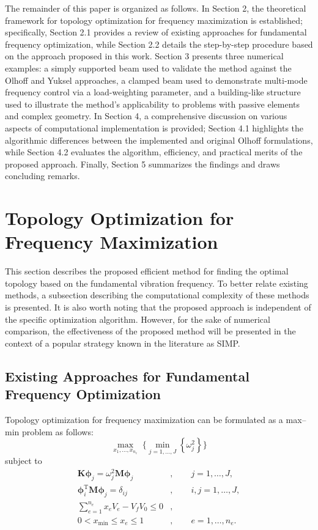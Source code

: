 \documentclass[applsci,article,submit,pdftex,moreauthors]{Definitions/mdpi}
\begin{document}
The remainder of this paper is organized as follows. In Section 2, the theoretical framework for topology optimization for frequency maximization is established; specifically, Section 2.1 provides a review of existing approaches for fundamental frequency optimization, while Section 2.2 details the step-by-step procedure based on the approach proposed in this work. Section 3 presents three numerical examples: a simply supported beam used to validate the method against the Olhoff and Yuksel approaches, a clamped beam used to demonstrate multi-mode frequency control via a load-weighting parameter, and a building-like structure used to illustrate the method's applicability to problems with passive elements and complex geometry. In Section 4, a comprehensive discussion on various aspects of computational implementation is provided; Section 4.1 highlights the algorithmic differences between the implemented and original Olhoff formulations, while Section 4.2 evaluates the algorithm, efficiency, and practical merits of the proposed approach. Finally, Section 5 summarizes the findings and draws concluding remarks.


\section{Topology Optimization for Frequency Maximization}

This section describes the proposed efficient method for finding the optimal topology based on the fundamental vibration frequency. To better relate existing methods, a subsection describing the computational complexity of these methods is presented. It is also worth noting that the proposed approach is independent of the specific optimization algorithm. However, for the sake of numerical comparison, the effectiveness of the proposed method will be presented in the context of a popular strategy known in the literature as SIMP.

\subsection{Existing Approaches for Fundamental Frequency Optimization}
Topology optimization for frequency maximization can be formulated as a max--min problem as follows:
\begin{equation}\label{eqn:minmax}
\max_{x_1,\ldots,x_{n_e}} \; \Bigg\{ \min_{j=1,\ldots,J} \left\{ \omega_j^2 \right\} \Bigg\}
\end{equation}
subject to
\begin{align*}
\mathbf{K}\boldsymbol{\phi}_j = \omega_j^2 \mathbf{M}\boldsymbol{\phi}_j &, \qquad j = 1,\ldots,J, \\[4pt]
\boldsymbol{\phi}_i^{\mathrm T} \mathbf{M} \boldsymbol{\phi}_j = \delta_{ij} &, \qquad i,j = 1,\ldots,J, \\[4pt]
\sum_{e=1}^{n_e} x_e V_e - V_f V_0 \le 0 &, \\[4pt]
0 < x_{\min} \le x_e \le 1 &, \qquad e = 1,\ldots,n_e.
\end{align*}
\end{document}
